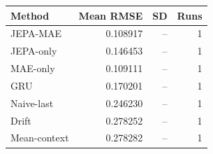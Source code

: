 \begin{tabular}{lrrr}
\hline
Method & Mean RMSE & SD & Runs \\
\hline
JEPA-MAE & 0.108917 & -- & 1 \\
JEPA-only & 0.146453 & -- & 1 \\
MAE-only & 0.109111 & -- & 1 \\
GRU & 0.170201 & -- & 1 \\
Naive-last & 0.246230 & -- & 1 \\
Drift & 0.278252 & -- & 1 \\
Mean-context & 0.278282 & -- & 1 \\
\hline
\end{tabular}
